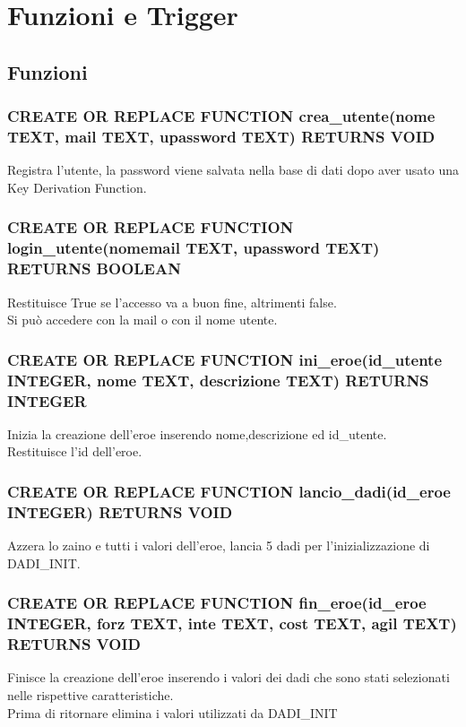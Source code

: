 \documentclass[11pt]{article}
\begin{document}
\section{Funzioni e Trigger}
\subsection{Funzioni}
\subsubsection{CREATE OR REPLACE FUNCTION crea\_utente(nome TEXT, mail TEXT, upassword TEXT) RETURNS VOID}
Registra l'utente, la password viene salvata nella base di dati dopo aver usato una Key Derivation Function.
\subsubsection{CREATE OR REPLACE FUNCTION login\_utente(nomemail TEXT, upassword TEXT) RETURNS BOOLEAN}
Restituisce True se l'accesso va a buon fine, altrimenti false.\\Si può accedere con la mail o con il nome utente.
\subsubsection{CREATE OR REPLACE FUNCTION ini\_eroe(id\_utente INTEGER, nome TEXT, descrizione TEXT) RETURNS INTEGER}
Inizia la creazione dell'eroe inserendo nome,descrizione ed id\_utente.\\Restituisce l'id dell'eroe.
\subsubsection{CREATE OR REPLACE FUNCTION lancio\_dadi(id\_eroe INTEGER) RETURNS VOID}
Azzera lo zaino e tutti i valori dell'eroe, lancia 5 dadi per l'inizializzazione di DADI\_INIT.
\subsubsection{CREATE OR REPLACE FUNCTION fin\_eroe(id\_eroe INTEGER, forz TEXT, inte TEXT, cost TEXT, agil TEXT) RETURNS VOID}
Finisce la creazione dell'eroe inserendo i valori dei dadi che sono stati selezionati nelle rispettive caratteristiche.\\
Prima di ritornare elimina i valori utilizzati da DADI\_INIT
\end{document}
